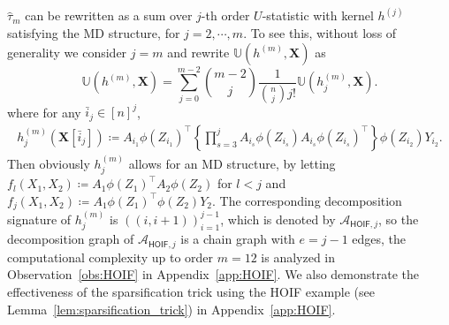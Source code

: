 \documentclass[sn-mathphys, natbib=false]{sn-jnl}
\newcommand{\libref}[2]{\href{#2}{\texttt{#1}}}
\theoremstyle{plain}
\theoremstyle{definition}
\newcommand{\ustat}{\mathbb{U}}
\newcommand{\ustatp}[2]{\ustat(#1,#2)}
\newcommand{\less}{O}
\newcommand{\opteinsum}{\libref{opt-einsum}{https://dgasmith.github.io/opt_einsum/}}
\def\calA{\mathcal{A}}
\begin{document}
\begin{bibunit}[agsm]
$\hat{\tau}_{m}$ can be rewritten as a sum over $j$-th order $U$-statistic with kernel $h^{(j)}$ satisfying the MD structure, for $j = 2, \cdots, m$. To see this, without loss of generality we consider $j = m$ and rewrite $\ustat (h^{(m)}, \bm{X})$ as
\begin{equation*}
\ustatp{h^{(m)}}{\bm{X}} = \sum_{j=0}^{m-2} \binom{m-2}{j} \frac{1}{\binom{n}{j} j!}  \ustatp{h_j^{(m)}}{\bm{X}}.
\end{equation*}
where for any $\bar{i}_{j} \in [n]^j$, 
\begin{align} 
\label{eq:hoif_kernel}
h_j^{(m)} (\bm{X}[\bar{i}_{j}]) \coloneqq A_{i_1} \phi (Z_{i_1})^{\top} \left\{ \prod_{s = 3}^{j} A_{i_s} \phi (Z_{i_s}) A_{i_s} \phi (Z_{i_s})^{\top} \right\} \phi (Z_{i_2}) Y_{i_2}.
\end{align}
Then obviously $h_j^{(m)}$ allows for an MD structure, by letting $f_{l} (X_1, X_2) \coloneqq A_1 \phi (Z_1)^{\top} A_2 \phi (Z_2)$ for $l < j$ and $f_{j} (X_1, X_2) \coloneqq A_1 \phi (Z_1)^{\top} \phi (Z_2) Y_2 $. The corresponding decomposition signature of $h_j^{(m)}$ is $((i, i+1))_{i=1}^{j-1}$, which is denoted by $\calA_{\mathsf{HOIF},j}$, so the decomposition graph of $\calA_{\mathsf{HOIF},j}$ is a chain graph with $e = j - 1$ edges, the computational complexity up to order $m=12$ is analyzed in Observation~\ref{obs:HOIF} in Appendix~\ref{app:HOIF}. We also demonstrate the effectiveness of the sparsification trick using the HOIF example (see Lemma~\ref{lem:sparsification_trick}) in Appendix~\ref{app:HOIF}.




\end{bibunit}
\end{document}
